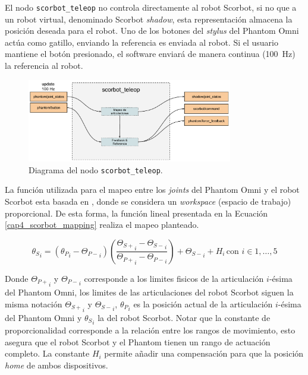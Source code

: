 El nodo \texttt{scorbot\_teleop} no controla directamente al robot Scorbot, si no que a un robot virtual, denominado Scorbot \textit{shadow}, esta representación almacena la posición deseada para el robot. Uno de los botones del \textit{stylus} del Phantom Omni actúa como gatillo, enviando la referencia es enviada al robot. Si el usuario mantiene el botón presionado, el software enviará de manera continua (\SI{100}{\hertz}) la referencia al robot.

\begin{figure}[H]
  \centering
  \includegraphics[width=0.8\textwidth]{img/cap4/scorbot_teleop.pdf}
  \caption{Diagrama del nodo \texttt{scorbot\_teleop}.}
  \label{cap4_scorbot_teleop}
\end{figure}

La función utilizada para el mapeo entre los \textit{joints} del Phantom Omni y el robot Scorbot esta basada en \cite{david}, donde se considera un \textit{workspace} (espacio de trabajo) proporcional. De esta forma, la función lineal presentada en la Ecuación \ref{cap4_scorbot_mapping} realiza el mapeo planteado.

\begin{equation}\label{cap4_scorbot_mapping}
{\theta_S}_{i} = ({\theta_P}_{i} - {\Theta_{P-}}_{i}) \left(  \frac{{\Theta_{S+}}_{i} - {\Theta_{S-}}_{i}}{{\Theta_{P+}}_{i} - {\Theta_{P-}}_{i}}   \right) + {\Theta_{S-}}_{i} + H_i \, \mbox{con } i \in {1, \dots, 5}
\end{equation}

Donde ${\Theta_{P+}}_i$ y ${\Theta_{P-}}_i$ corresponde a los limites fisicos de la articulación $i$-ésima del Phantom Omni, los limites de las articulaciones del robot Scorbot siguen la misma notación ${\Theta_{S+}}_i$ y ${\Theta_{S-}}_i$, ${\theta_P}_{i}$ es la posición actual de la articulación $i$-ésima del Phantom Omni y ${\theta_S}_{i}$ la del robot Scorbot. Notar que la constante de proporcionalidad corresponde a la relación entre los rangos de movimiento, esto asegura que el robot Scorbot y el Phantom tienen un rango de actuación completo. La constante $H_i$ permite añadir una compensación para que la posición \textit{home} de ambos dispositivos.

